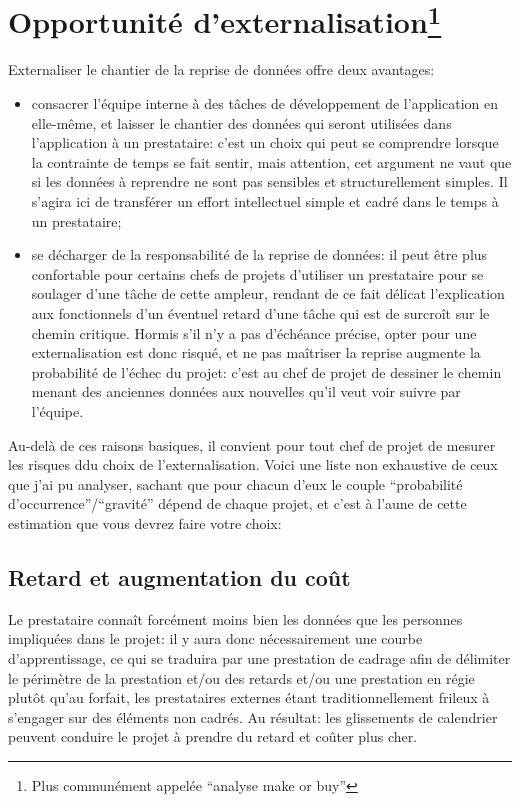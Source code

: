 \documentclass{book}
\begin{document}
\chapter[Choix d'externalisation]{Opportunité d'externalisation\footnote{Plus communément appelée ``analyse make or buy''}}

Externaliser le chantier de la reprise de données offre deux avantages:
\begin{itemize}
 \item consacrer l'équipe interne à des tâches de développement de l'application en elle-même, et laisser le chantier des données qui seront utilisées dans l'application à un prestataire: c'est un choix qui peut se comprendre lorsque la contrainte de temps se fait sentir, mais attention, cet argument ne vaut que si les données à reprendre ne sont pas sensibles et structurellement simples. Il s'agira ici de transférer un effort intellectuel simple et cadré dans le temps à un prestataire;
 \item se décharger de la responsabilité de la reprise de données: il peut être plus confortable pour certains chefs de projets d'utiliser un prestataire pour se soulager d'une tâche de cette ampleur, rendant de ce fait délicat l'explication aux \gls{fonctionnels} d'un éventuel retard d'une tâche qui est de surcroît sur le chemin critique. Hormis s'il n'y a pas d'échéance précise, opter pour une externalisation est donc risqué, et ne pas maîtriser la reprise augmente la probabilité de l'échec du projet: c'est au chef de projet de dessiner le chemin menant des anciennes données aux nouvelles qu'il veut voir suivre par l'équipe.
\end{itemize}

Au-delà de ces raisons basiques, il convient pour tout chef de projet de mesurer les risques ddu choix de l'externalisation. Voici une liste non exhaustive de ceux que j'ai pu analyser, sachant que pour chacun d'eux le couple ``probabilité d'occurrence''/``gravité'' dépend de chaque projet, et c'est à l'aune de cette estimation que vous devrez faire votre choix:

\section{Retard et augmentation du coût}

Le prestataire connaît forcément moins bien les données que les personnes impliquées dans le projet: il y aura donc nécessairement une courbe d'apprentissage, ce qui se traduira par une prestation de cadrage afin de délimiter le périmètre de la prestation et/ou des retards et/ou une prestation en régie plutôt qu'au forfait, les prestataires externes étant traditionnellement frileux à s'engager sur des éléments non cadrés. Au résultat: les glissements de calendrier peuvent conduire le projet à prendre du retard et coûter plus cher.
\end{document}
